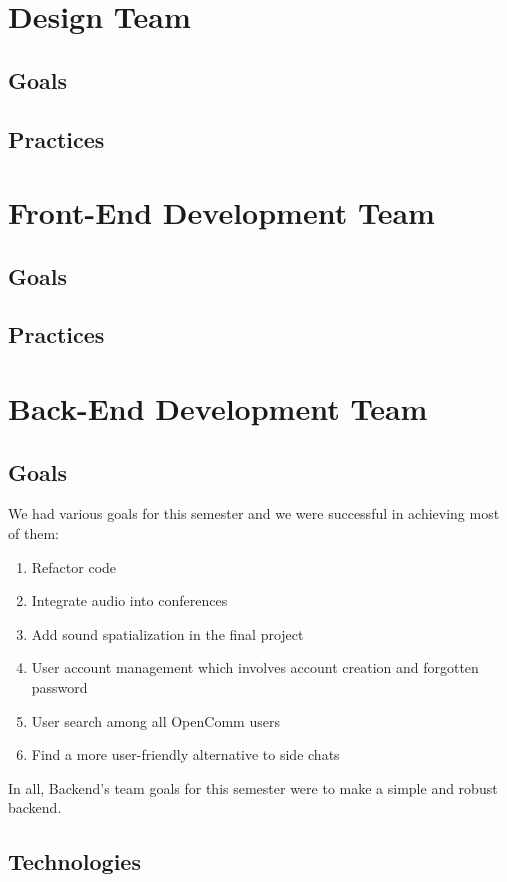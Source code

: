 \documentclass[12pt, letterpaper]{article}
\begin{document}
\section{Design Team}
\subsection{Goals}
\subsection{Practices}

\section{Front-End Development Team}
\subsection{Goals}
\subsection{Practices}

\section{Back-End Development Team}
\subsection{Goals}
We had various goals for this semester and we were successful in achieving most of them:
\begin{enumerate}
\item Refactor code
\item Integrate audio into conferences
\item Add sound spatialization in the final project
\item User account management which involves account creation and forgotten password
\item User search among all OpenComm users
\item Find a more user-friendly alternative to side chats
\end{enumerate}

In all, Backend’s team goals for this semester were to make a simple and robust backend. 

\subsection{Technologies}
\end{document}
